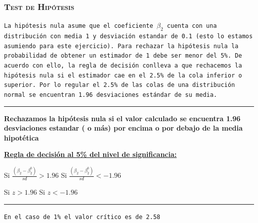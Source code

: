 \documentclass[16.5pt]{beamer}
\begin{document}
{
\begin{frame}
\frametitle{\textsc{Test de Hipótesis}}
\hspace*{-5mm}
\vspace*{-5mm} 

\texttt{La hipótesis nula asume que el coeficiente $\beta_2$ cuenta con una distribución con media 1 y desviación estandar de 0.1 (esto lo estamos asumiendo para este ejercicio). Para rechazar la hipótesis nula la probabilidad de obtener un estimador de 1 debe ser menor del 5\%. De acuerdo con ello, la regla de decisión conlleva a que rechacemos la hipótesis nula  si el estimador cae en el 2.5\% de la cola inferior o superior. Por lo regular el 2.5\% de las colas de una distribución normal se encuentran 1.96 desviaciones estándar de su media.}
\vspace{0.1cm}

\hrule  

\vspace{0.1cm}
\textbf{Rechazamos la hipótesis nula si el valor calculado se encuentra 1.96 desviaciones estandar ( o más) por encima o por debajo de la media hipotética}

\textbf{\underline{Regla de decisión al 5\% del nivel de significancia:}}

Si $\frac{(\beta_2 -\beta_2^0)}{sd}>1.96$  Si $\frac{(\beta_2 -\beta_2^0)}{sd}<-1.96$

\vspace{0.1cm}

Si $z>1.96$  Si  $z<-1.96$

\vspace{0.1cm}

\hrule  

\vspace{0.1cm}

\texttt{En el caso de 1\% el valor crítico es de 2.58}

\end{frame}
}
\end{document}
